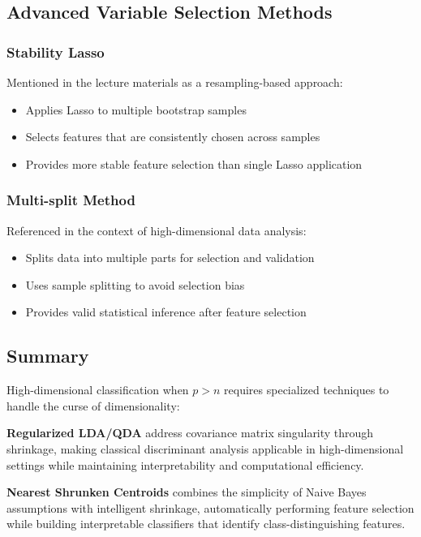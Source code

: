 \documentclass[12pt,a4paper]{article}
\begin{document}
\subsection{Advanced Variable Selection Methods}

\subsubsection{Stability Lasso}

Mentioned in the lecture materials as a resampling-based approach:
\begin{itemize}
    \item Applies Lasso to multiple bootstrap samples
    \item Selects features that are consistently chosen across samples
    \item Provides more stable feature selection than single Lasso application
\end{itemize}

\subsubsection{Multi-split Method}

Referenced in the context of high-dimensional data analysis:
\begin{itemize}
    \item Splits data into multiple parts for selection and validation
    \item Uses sample splitting to avoid selection bias
    \item Provides valid statistical inference after feature selection
\end{itemize}

\subsection{Summary}

High-dimensional classification when $p > n$ requires specialized techniques to handle the curse of dimensionality:

\textbf{Regularized LDA/QDA} address covariance matrix singularity through shrinkage, making classical discriminant analysis applicable in high-dimensional settings while maintaining interpretability and computational efficiency.

\textbf{Nearest Shrunken Centroids} combines the simplicity of Naive Bayes assumptions with intelligent shrinkage, automatically performing feature selection while building interpretable classifiers that identify class-distinguishing features.
\end{document}
